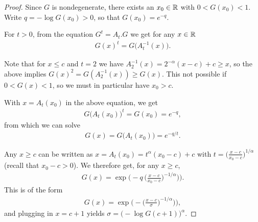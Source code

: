 \begin{proof}

  Since $G$ is nondegenerate, there exists an $x_0 \in \mathbb{R}$
  with $0 < G(x_0) < 1$. Write $q = -\log G(x_0) > 0$,
  so that $G(x_0) = e^{-q}$.

  For $t > 0$, from the equation $G^{t} = A_t . G$
  we get for any $x \in \mathbb{R}$
  \begin{align*}
  G(x)^t = G \big( A_t^{-1}(x) \big) . %
  \end{align*}

  Note that for $x \le c$ and $t = 2$ we have $A_2^{-1}(x) = 2^{-\alpha}(x-c) + c \ge x$,
  so the above implies $G(x)^2 = G(A_2^{-1}(x)) \ge G(x)$.
  This not possible if $0 < G(x) < 1$, so we must in particular have $x_0 > c$.

  With $x = A_t(x_0)$ in the above equation, %
  we get
  \begin{align*}
    G\big( A_t(x_0) \big)^{t} = G(x_0) = e^{- q},
  \end{align*}
  from which we can solve
  \begin{align*}
    G(x) = G\big( A_t(x_0) \big) = e^{-q/t} .
  \end{align*}

  Any $x \ge c$ can be written as $x = A_t(x_0) = t^{\alpha} (x_0-c) + c$
  with $t = \big( \frac{x - c}{x_0 - c} \big)^{1/\alpha}$
  (recall that $x_0 - c > 0$).
  We therefore get, for any $x \ge c$,
  \begin{align*}
    G(x) = \exp \Big( - q \, \big( \frac{x - c}{x_0 - c} \big)^{-1/\alpha} \big) \Big) .
  \end{align*}
  This is of the form
  \begin{align*}
    G(x) = \exp \Big( - \big( \frac{x - c}{\sigma} \big)^{-1/\alpha} \big) \Big) ,
  \end{align*}
  and plugging in $x = c + 1$ yields $\sigma = \big(- \log G(c+1)\big)^{\alpha}$.
\end{proof}

